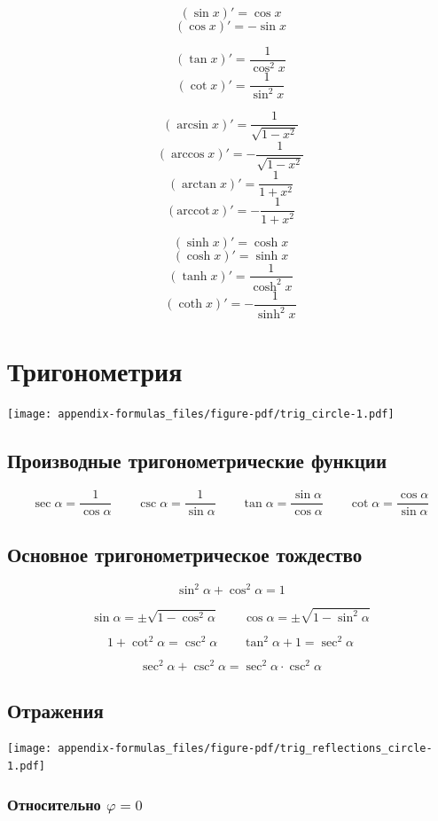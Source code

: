 \documentclass[
  letterpaper,
  DIV=11,
  numbers=noendperiod]{scrreprt}
\theoremstyle{definition}
\theoremstyle{remark}
\begin{document}
\[(\sin x)' = \cos x\] \[(\cos x)' = -\sin x\]

\[(\tan x)' = \frac{1}{\cos^2 x}\] \[(\cot x)' = \frac{1}{\sin^2 x}\]

\[(\arcsin x)' = \frac{1}{\sqrt{1 - x^2}}\]
\[(\arccos x)' = -\frac{1}{\sqrt{1 - x^2}}\]
\[(\arctan x)' = \frac{1}{1 + x^2}\]
\[(\text{arccot}\, x)' = -\frac{1}{1 + x^2}\]

\[(\sinh x)' = \cosh x\] \[(\cosh x)' = \sinh x\]
\[(\tanh x)' = \frac{1}{\cosh^2 x}\]
\[(\coth x)' = -\frac{1}{\sinh^2 x}\]

\section{Тригонометрия}\label{formulas_trig}

\texttt{[image: appendix-formulas\_files/figure-pdf/trig\_circle-1.pdf]}

\subsection{Производные тригонометрические функции}\label{trig_funs_def}

\[
\sec \alpha = \frac{1}{\cos \alpha} \qquad
\csc \alpha = \frac{1}{\sin \alpha} \qquad
\tan \alpha = \frac{\sin \alpha}{\cos \alpha} \qquad
\cot \alpha = \frac{\cos \alpha}{\sin \alpha}
\]

\subsection{Основное тригонометрическое
тождество}\label{trig_pythagorean_identities}

\[
\sin^2 \alpha + \cos^2 \alpha = 1
\]

\[
\sin \alpha = \pm \sqrt{1 - \cos^2 \alpha} \qquad \cos \alpha = \pm \sqrt{1 - \sin^2 \alpha}
\]

\[
1 + \cot^2 \alpha = \csc^2 \alpha \qquad
\tan^2 \alpha + 1 = \sec ^2 \alpha
\]

\[
\sec^2 \alpha + \csc^2 \alpha = \sec^2 \alpha \cdot \csc^2 \alpha
\]

\subsection{Отражения}\label{trig_reflections}

\texttt{[image: appendix-formulas\_files/figure-pdf/trig\_reflections\_circle-1.pdf]}

\subsubsection{\texorpdfstring{Относительно
\(\varphi = 0\)}{Относительно \textbackslash varphi = 0}}\label{trig_reflections_0}
\end{document}
